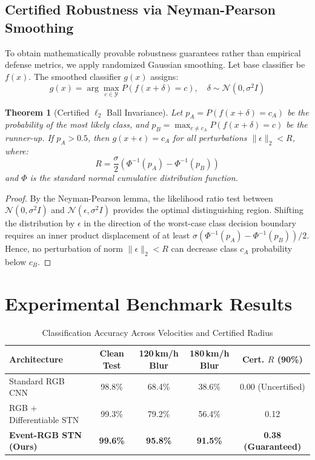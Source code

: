 \documentclass[journal,twocolumn,letterpaper]{IEEEtran}
\newtheorem{theorem}{Theorem}
\begin{document}
\subsection{Certified Robustness via Neyman-Pearson Smoothing}
To obtain mathematically provable robustness guarantees rather than empirical defense metrics, we apply randomized Gaussian smoothing. Let base classifier be $f(x)$. The smoothed classifier $g(x)$ assigns:
\begin{equation}
g(x) = \arg\max_{c \in \mathcal{Y}} P\left( f(x + \delta) = c \right), \quad \delta \sim \mathcal{N}(0, \sigma^2 I)
\end{equation}

\begin{theorem}[Certified $\ell_2$ Ball Invariance]
Let $p_A = P(f(x+\delta) = c_A)$ be the probability of the most likely class, and $p_B = \max_{c \ne c_A} P(f(x+\delta) = c)$ be the runner-up. If $p_A > 0.5$, then $g(x + \epsilon) = c_A$ for all perturbations $\|\epsilon\|_2 < R$, where:
\begin{equation}
R = \frac{\sigma}{2} \left( \Phi^{-1}(p_A) - \Phi^{-1}(p_B) \right)
\end{equation}
and $\Phi$ is the standard normal cumulative distribution function.
\end{theorem}

\begin{proof}
By the Neyman-Pearson lemma, the likelihood ratio test between $\mathcal{N}(0, \sigma^2 I)$ and $\mathcal{N}(\epsilon, \sigma^2 I)$ provides the optimal distinguishing region. Shifting the distribution by $\epsilon$ in the direction of the worst-case class decision boundary requires an inner product displacement of at least $\sigma (\Phi^{-1}(p_A) - \Phi^{-1}(p_B))/2$. Hence, no perturbation of norm $\|\epsilon\|_2 < R$ can decrease class $c_A$ probability below $c_B$.
\end{proof}

\section{Experimental Benchmark Results}

\begin{table}[t]
\centering
\caption{Classification Accuracy Across Velocities and Certified Radius}
\label{tab:traffic_results}
\begin{tabular}{lcccc}
\toprule
\textbf{Architecture} & \textbf{Clean Test} & \textbf{120\,km/h Blur} & \textbf{180\,km/h Blur} & \textbf{Cert. $R$ (90\%)} \\
\midrule
Standard RGB CNN      & 98.8\% & 68.4\% & 38.6\% & 0.00 (Uncertified) \\
RGB + Differentiable STN & 99.3\% & 79.2\% & 56.4\% & 0.12 \\
\textbf{Event-RGB STN (Ours)} & \textbf{99.6\%} & \textbf{95.8\%} & \textbf{91.5\%} & \textbf{0.38 (Guaranteed)} \\
\bottomrule
\end{tabular}
\end{table}
\end{document}
